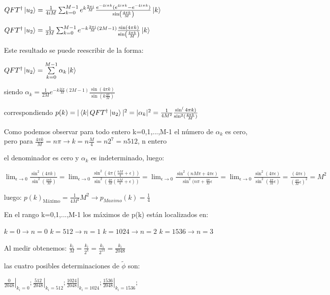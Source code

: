 \documentclass[11pt, spanish]{report}
\begin{document}
$QFT^\dagger \ket{u_2} = \frac{1}{4 i M} \sum_{k=0}^{M-1} e^{k \frac{2 \pi i}{M}} \frac{e^{-4 i \pi k} (e^{4 i \pi k} - e^{-4 i \pi k})}{\sin(\frac{4\pi k}{M})} \ket{k}$

$QFT^\dagger \ket{u_2} = \frac{1}{2M} \sum_{k=0}^{M-1} e^{-k \frac{2 \pi i}{M} (2M-1)} \frac{\sin(4\pi k)}{\sin(\frac{4\pi k}{M})} \ket{k}$

Este resultado se puede reescribir de la forma:

$QFT^\dagger \ket{u_2} = \sum\limits_{k=0}^{M-1} \alpha_k \ket{k}$

siendo $\alpha_k = \frac{1}{2M} e^{-k \frac{2 i \pi}{M} (2M-1)} \frac{\sin(4 \pi k)}{\sin(k \frac{4 \pi}{M})}$

correspondiendo $p(k) = |\bra{k} QFT^\dagger \ket{u_2}|^2 = |\alpha_k|^2 = \frac{1}{4M^2} \frac{\sin^(4\pi k)}{\sin^2(\frac{4 \pi k}{M})}$

Como podemos observar para todo entero k=0,1,...,M-1 el número de $\alpha_k$ es cero, pero para $\frac{4 \pi k}{M} = n \pi \rightarrow k = n \frac{M}{4} = n 2^7 = n 512$, n entero

el denominador es cero y $\alpha_k$ es indeterminado, luego:

$\lim_{\epsilon \to 0} \frac{\sin^2(4 \pi k)}{\sin^2(\frac{4\pi k}{M})} = \lim_{\epsilon \to 0} \frac{\sin^2(4 \pi (\frac{n M}{4} + \epsilon))}{\sin^2(\frac{4\pi}{M} (\frac{n M}{4} + \epsilon))} = \lim_{\epsilon \to 0} \frac{\sin^2(n M \pi + 4 \pi \epsilon)}{\sin^2(n \pi + \frac{4\pi}{M} \epsilon} = \lim_{\epsilon \to 0} \frac{\sin^2(4 \pi \epsilon)}{\sin^2(\frac{4 \pi}{M} \epsilon)} = \frac{(4 \pi \epsilon)}{(\frac{4 \pi}{M} \epsilon)^2} = M^2$

luego: $p(k)_{\text{Máximo}} = \frac{1}{4M^2} M^2 \rightarrow p_{Maximo}(k) = \frac{1}{4}$

En el rango k=0,1,...,M-1 los máximos de p(k) están localizados en:

$k=0 \rightarrow n=0$
$k=512 \rightarrow n=1$
$k=1024 \rightarrow n=2$
$k=1536 \rightarrow n=3$


Al medir obtenemos: $\frac{k_i}{M} = \frac{k_i}{2^k} = \frac{k_i}{2^{13}} = \frac{k_i}{2048}$

las cuatro posibles determinaciones de $\tilde{\phi}$ son:

$\left. \frac{0}{2048} \right|_{k_i=0}; \left. \frac{512}{2048} \right|_{k_i=512}; \left. \frac{1024}{2048} \right|_{k_i=1024}; \left. \frac{1536}{2048} \right|_{k_i=1536};$
\end{document}
